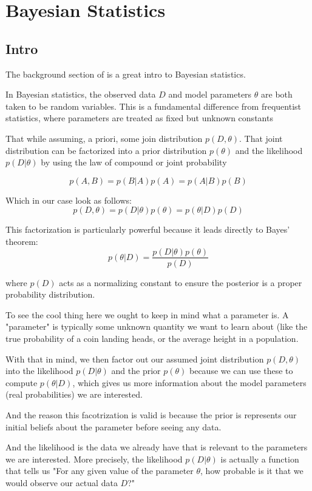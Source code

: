 \chapter{Bayesian Statistics}

\section{Intro}

The background section of \cite{maclaurin2016thesis} is a great intro to Bayesian statistics.

In Bayesian statistics, the observed data $D$ and model parameters $\theta$ are both taken to be random
variables.
This is a fundamental difference from frequentist statistics, where parameters are treated as fixed
but unknown constants

That while assuming, a priori, some join distribution $p(D, \theta)$.
That joint distribution can be factorized into a prior distribution $p(\theta)$ and the likelihood
$p(D|\theta)$ by using the law of compound or joint probability

$$
p(A, B) = p(B|A) p(A) = p(A|B) p(B)
$$

Which in our case look as follows:
$$
p(D, \theta)
= p(D|\theta) p(\theta)
= p(\theta | D) p(D)
$$

This factorization is particularly powerful because it leads directly to Bayes' theorem:
$$
p(\theta |D) = \frac{ p(D|\theta) p(\theta) }{p(D)}
$$

where $p(D)$ acts as a normalizing constant to ensure the posterior is a proper probability distribution.

To see the cool thing here we ought to keep in mind what a parameter is.
A "parameter" is typically some unknown quantity we want to learn about
(like the true probability of a coin landing heads, or the average height in a population.

With that in mind, we then factor out our assumed joint distribution $p(D, \theta)$ into the likelihood
$p(D|\theta)$ and the prior $p(\theta)$ because we can use these to compute $p(\theta |D)$,
which gives us more information about the model parameters (real probabilities) we are interested.

And the reason this facotrization is valid is because the prior is
represents our initial beliefs about the parameter before seeing any data.



And the likelihood is the data we already have that is relevant to the parameters we are interested.
More precisely, the likelihood $p(D|\theta)$ is actually a function that tells us
"For any given value of the parameter $\theta$, how probable is it that we would observe our actual
data $D$?"

